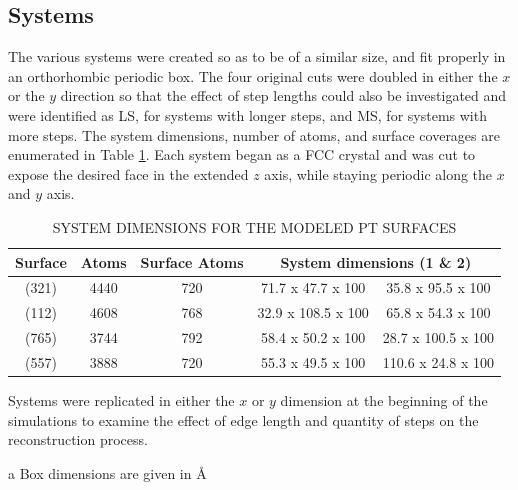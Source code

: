 \subsection{Systems}

The various  systems were created so as to be of a similar size, and fit
properly in an orthorhombic periodic box. The four original cuts were doubled
in either the $x$ or the $y$ direction so that the effect of step lengths could
also be investigated and were identified as LS, for systems with longer steps,
and MS, for systems with more steps. The system dimensions, number of atoms,
and surface coverages are enumerated in Table \ref{tab:dimensions}. Each system
began as a FCC crystal and was cut to expose the desired face in the extended
$z$ axis, while staying periodic along the $x$ and $y$ axis.

\begin{table}
\caption{SYSTEM DIMENSIONS FOR THE MODELED PT SURFACES}
\centering
\begin{threeparttable}
\centering
\begin{tabular}{c c c c c}
\hline\hline
Surface & Atoms & Surface Atoms & \multicolumn{2}{c}{System dimensions\tnote{a} (1 \& 2)}  \\ 
\hline
(321) & 4440 & 720 & 71.7 x 47.7 x 100 & 35.8 x 95.5 x 100\\
(112) & 4608 & 768 & 32.9 x 108.5 x 100 & 65.8 x 54.3 x 100\\
(765) & 3744 & 792 & 58.4 x 50.2 x 100 & 28.7 x 100.5 x 100\\
(557) & 3888 & 720 & 55.3 x 49.5 x 100 & 110.6 x 24.8 x 100\\
\hline
\hline
\end{tabular}
\begin{tablenotes}
  \item Systems were replicated in either the $x$ or $y$ dimension at the
beginning of the simulations to examine the effect of edge length and quantity
of steps on the reconstruction process.
  \item[a] Box dimensions are given in \AA
\end{tablenotes}
\end{threeparttable}
\label{tab:dimensions}
\end{table}


